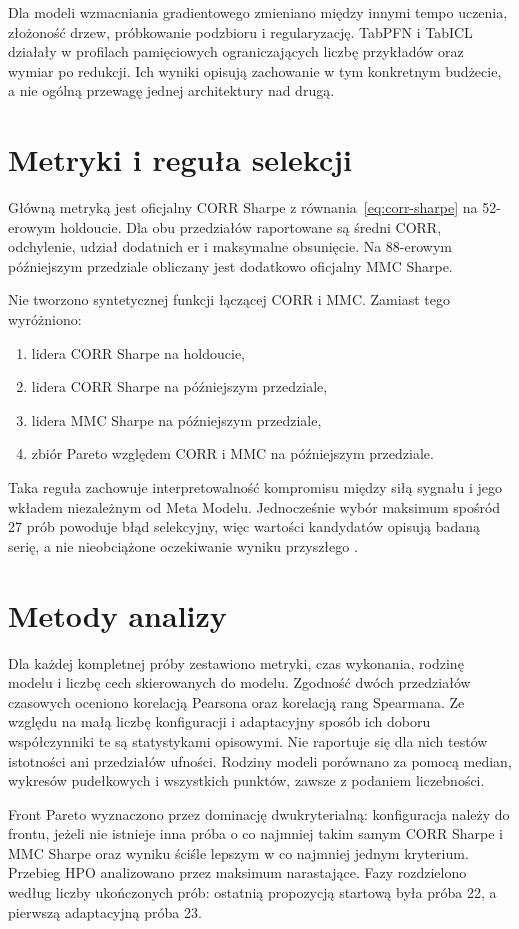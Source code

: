 \documentclass[12pt,a4paper]{report}
\newcommand{\sourcecite}[1]{\autocite{#1}}
\begin{document}
Dla modeli wzmacniania gradientowego zmieniano między innymi tempo uczenia,
złożoność drzew, próbkowanie podzbioru i regularyzację. TabPFN i TabICL działały w profilach pamięciowych
ograniczających liczbę przykładów oraz wymiar po redukcji. Ich wyniki opisują
zachowanie w tym konkretnym budżecie, a nie ogólną przewagę jednej architektury
nad drugą.

\section{Metryki i reguła selekcji}
Główną metryką jest oficjalny CORR Sharpe z równania~\eqref{eq:corr-sharpe}
na 52-erowym holdoucie. Dla obu przedziałów raportowane są średni CORR,
odchylenie, udział dodatnich er i maksymalne obsunięcie. Na 88-erowym
późniejszym przedziale obliczany jest dodatkowo oficjalny MMC Sharpe.

Nie tworzono syntetycznej funkcji łączącej CORR i MMC. Zamiast tego wyróżniono:
\begin{enumerate}\item lidera CORR Sharpe na holdoucie,
\item lidera CORR Sharpe na późniejszym przedziale,
\item lidera MMC Sharpe na późniejszym przedziale,
\item zbiór Pareto względem CORR i MMC na późniejszym przedziale.\end{enumerate}
Taka reguła zachowuje interpretowalność kompromisu między siłą sygnału i jego
wkładem niezależnym od Meta Modelu. Jednocześnie wybór maksimum spośród 27 prób
powoduje błąd selekcyjny, więc wartości kandydatów opisują badaną serię, a nie
nieobciążone oczekiwanie wyniku przyszłego \sourcecite{cawley-talbot,varma-simon}.

\section{Metody analizy}
Dla każdej kompletnej próby zestawiono metryki, czas wykonania, rodzinę modelu
i liczbę cech skierowanych do modelu. Zgodność dwóch przedziałów czasowych oceniono korelacją
Pearsona oraz korelacją rang Spearmana. Ze względu na małą liczbę konfiguracji
i adaptacyjny sposób ich doboru współczynniki te są statystykami opisowymi. Nie
raportuje się dla nich testów istotności ani przedziałów ufności. Rodziny modeli
porównano za pomocą median, wykresów pudełkowych i wszystkich punktów, zawsze
z podaniem liczebności.

Front Pareto wyznaczono przez dominację dwukryterialną: konfiguracja należy do frontu,
jeżeli nie istnieje inna próba o co najmniej takim samym CORR Sharpe i MMC Sharpe
oraz wyniku ściśle lepszym w co najmniej jednym kryterium. Przebieg HPO analizowano
przez maksimum narastające. Fazy rozdzielono według liczby ukończonych prób:
ostatnią propozycją startową była próba 22, a pierwszą adaptacyjną próba 23.
\end{document}
